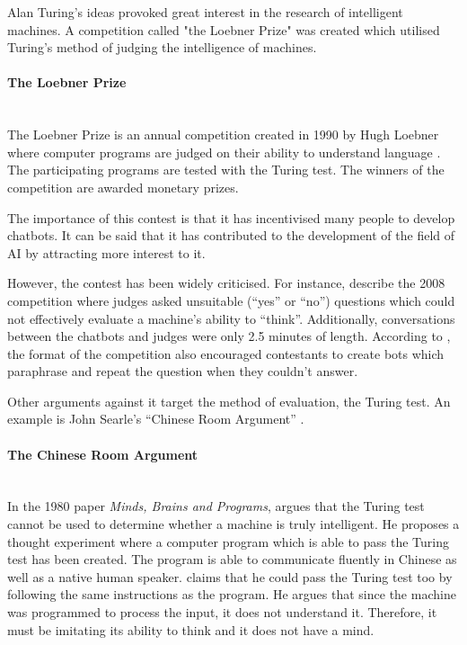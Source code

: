 \documentclass[12pt,a4paper]{article}
\newcommand{\myparagraph}[1]{\paragraph{#1}\mbox{}\\}
\begin{document}
Alan Turing's ideas provoked great interest in the research of intelligent machines. A competition called "the Loebner Prize" was created which utilised Turing's method of judging the intelligence of machines.

\myparagraph{The Loebner Prize}
The Loebner Prize is an annual competition created in 1990 by Hugh Loebner where computer programs are judged on their ability to understand language  \citep{loebner:online}. The participating programs are tested with the Turing test. The winners of the competition are awarded monetary prizes.

The importance of this contest is that it has incentivised many people to develop chatbots. It can be said that it has contributed to the development of the field of AI by attracting more interest to it.

However, the contest has been widely criticised. For instance, \citet{Floridi2009} describe the 2008 competition where judges asked unsuitable (\enquote{yes} or \enquote{no}) questions which could not effectively evaluate a machine's ability to \enquote{think}. Additionally, conversations between the chatbots and judges were only 2.5 minutes of length. According to \citet{Floridi2009}, the format of the competition also encouraged contestants to create bots which paraphrase and repeat the question when they couldn't answer.

Other arguments against it target the method of evaluation, the Turing test. An example is John Searle's \enquote{Chinese Room Argument} \citep{Searle1980}.

\myparagraph{The Chinese Room Argument}
In the 1980 paper \textit{Minds, Brains and Programs}, \citet{Searle1980} argues that the Turing test cannot be used to determine whether a machine is truly intelligent. He proposes a thought experiment where a computer program which is able to pass the Turing test has been created. The program is able to communicate fluently in Chinese as well as a native human speaker. \citet{Searle1980} claims that he could pass the Turing test too by following the same instructions as the program. He argues that since the machine was programmed to process the input, it does not understand it. Therefore, it must be imitating its ability to think and it does not have a mind.
\end{document}
